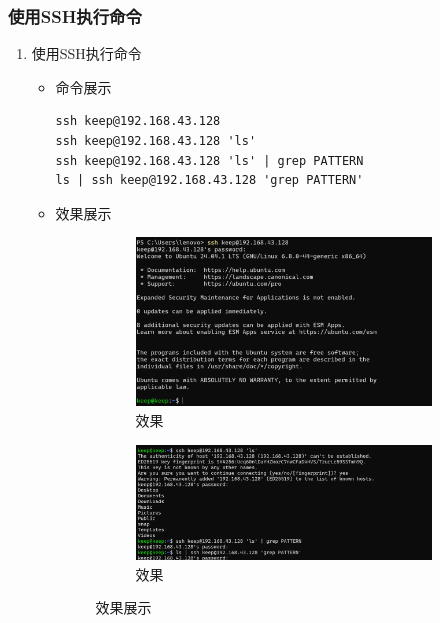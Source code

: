 \documentclass[UTF8]{ctexart}
\begin{document}
\subsubsection{使用SSH执行命令}

\begin{enumerate}
  \item 使用SSH执行命令
  \begin{itemize}
  \item 命令展示
  \begin{verbatim}
ssh keep@192.168.43.128 
ssh keep@192.168.43.128 'ls'
ssh keep@192.168.43.128 'ls' | grep PATTERN
ls | ssh keep@192.168.43.128 'grep PATTERN'

  \end{verbatim}
\item 效果展示
  \begin{figure}[H]
    \centering
    \begin{subfigure}[b]{0.48\textwidth}
        \includegraphics[width=\textwidth]{115} %
        \caption{效果}
        \label{fig:left}
    \end{subfigure}
    \hfill
    \begin{subfigure}[b]{0.48\textwidth}
        \includegraphics[width=\textwidth]{116} %
        \caption{效果}
        \label{fig:right}
    \end{subfigure}
    \caption{效果展示}
    \label{fig:side_by_side}
\end{figure}
  \end{itemize}
\end{enumerate}
\end{document}
